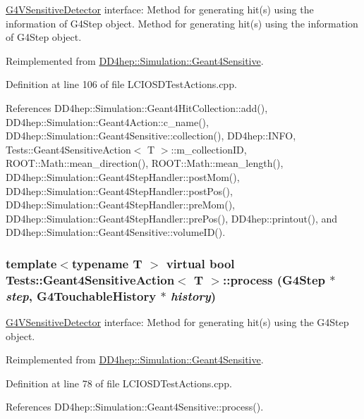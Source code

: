 \hyperlink{class_g4_v_sensitive_detector}{G4VSensitiveDetector} interface: Method for generating hit(s) using the information of G4Step object. Method for generating hit(s) using the information of G4Step object. 

Reimplemented from \hyperlink{class_d_d4hep_1_1_simulation_1_1_geant4_sensitive_a9a9463a6c29a66dad43a52ffc9f7838d}{DD4hep::Simulation::Geant4Sensitive}.

Definition at line 106 of file LCIOSDTestActions.cpp.

References DD4hep::Simulation::Geant4HitCollection::add(), DD4hep::Simulation::Geant4Action::c\_\-name(), DD4hep::Simulation::Geant4Sensitive::collection(), DD4hep::INFO, Tests::Geant4SensitiveAction$<$ T $>$::m\_\-collectionID, ROOT::Math::mean\_\-direction(), ROOT::Math::mean\_\-length(), DD4hep::Simulation::Geant4StepHandler::postMom(), DD4hep::Simulation::Geant4StepHandler::postPos(), DD4hep::Simulation::Geant4StepHandler::preMom(), DD4hep::Simulation::Geant4StepHandler::prePos(), DD4hep::printout(), and DD4hep::Simulation::Geant4Sensitive::volumeID().\hypertarget{class_tests_1_1_geant4_sensitive_action_a6ae919f9aeb71219a38300d3918ed814}{
\subsubsection[{process}]{\setlength{\rightskip}{0pt plus 5cm}template$<$typename T $>$ virtual bool {\bf Tests::Geant4SensitiveAction}$<$ {\bf T} $>$::process (G4Step $\ast$ {\em step}, \/  G4TouchableHistory $\ast$ {\em history})}}
\label{class_tests_1_1_geant4_sensitive_action_a6ae919f9aeb71219a38300d3918ed814}


\hyperlink{class_g4_v_sensitive_detector}{G4VSensitiveDetector} interface: Method for generating hit(s) using the G4Step object. 

Reimplemented from \hyperlink{class_d_d4hep_1_1_simulation_1_1_geant4_sensitive_a9a9463a6c29a66dad43a52ffc9f7838d}{DD4hep::Simulation::Geant4Sensitive}.

Definition at line 78 of file LCIOSDTestActions.cpp.

References DD4hep::Simulation::Geant4Sensitive::process().

